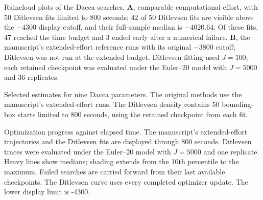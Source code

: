 
\caption{Raincloud plots of the Dacca searches. \textbf{A}, comparable
computational effort, with 50 Ditlevsen fits limited to 800 seconds;
42 of 50 Ditlevsen fits are visible above the
$-4300$ display cutoff, and their full-sample median is
$-4020.64$. Of these fits, 47 reached the time budget and
3 ended early after a numerical failure. \textbf{B}, the
manuscript's extended-effort reference runs with its original
$-3800$ cutoff; Ditlevsen was not run at the
extended budget. Ditlevsen fitting used $J=100$; each retained
checkpoint was evaluated under the Euler--20 model with $J=5000$
and 36 replicates.}

\caption{Selected estimates for nine Dacca parameters. The original methods
use the manuscript's extended-effort runs. The Ditlevsen density contains
50 bounding-box starts limited to 800 seconds, using the retained
checkpoint from each fit.}

\caption{Optimization progress against elapsed time. The manuscript's
extended-effort trajectories and the Ditlevsen fits are displayed through
800 seconds. Ditlevsen traces were evaluated under the Euler--20 model
with $J=5000$ and one replicate. Heavy lines show medians;
shading extends from the 10th percentile to the maximum. Failed searches are
carried forward from their last available checkpoints. The Ditlevsen curve uses every completed optimizer update. The lower display limit
is -4300.}

